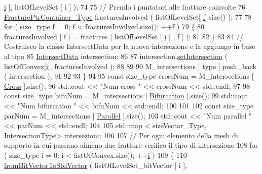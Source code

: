 \begin{DoxyCode}
      \hyperlink{matrici_8m_a6f6ccfcf58b31cb6412107d9d5281426}{i} ], listOfLevelSet [ i ] );
74             
75             \textcolor{comment}{// Prendo i puntatori alle fratture coinvolte}
76             \hyperlink{FractureHandler_8h_a2f0b57e18ecf89912d7de0c87158009e}{FracturePtrContainer\_Type} fracturesInvolved ( listOfLevelSet[
      \hyperlink{matrici_8m_a6f6ccfcf58b31cb6412107d9d5281426}{i}].size() );
77 
78             \textcolor{keywordflow}{for} ( size\_type f = 0; f < fracturesInvolved.size(); ++f )
79             \{
80                  fracturesInvolved [ f ] = fractures [ listOfLevelSet [ \hyperlink{matrici_8m_a6f6ccfcf58b31cb6412107d9d5281426}{i} ] [ f ] ];
81 
82             \}
83 
84             \textcolor{comment}{// Costruisco la classe IntersectData per la nuova intersezione e la aggiungo in base al tipo}
85             \hyperlink{classIntersectData}{IntersectData} intersection;
86 
87             intersection.\hyperlink{classIntersectData_a306be572e6e9a2359310ba908e693b2e}{setIntersection} ( listOfConvex[\hyperlink{matrici_8m_a6f6ccfcf58b31cb6412107d9d5281426}{i}], fracturesInvolved );
88             
89             
90             M\_intersections [ type ].push\_back ( intersection );
91 
92 
93         \}
94 
95         \textcolor{keyword}{const} size\_type crossNum = M\_intersections [ \hyperlink{classFractureIntersect_a9a4e4a784fa4c8e359767ed543f89dc5a743fef1af81c0e61412fafb9438b380e}{Cross} ].size();
96         std::cout << \textcolor{stringliteral}{"Num cross "} << crossNum << std::endl;
97 
98         \textcolor{keyword}{const} size\_type bifuNum = M\_intersections [ \hyperlink{classFractureIntersect_a9a4e4a784fa4c8e359767ed543f89dc5a4d466b3d3de0af7e18732b6f765bb1af}{Bifurcation} ].size();
99         std::cout << \textcolor{stringliteral}{"Num bifurcation "} << bifuNum << std::endl;
100 
101 
102         \textcolor{keyword}{const} size\_type parNum = M\_intersections [ \hyperlink{classFractureIntersect_a9a4e4a784fa4c8e359767ed543f89dc5ad91760e1506b52a828bc401490f7c92b}{Parallel} ].size();
103         std::cout << \textcolor{stringliteral}{"Num parallel "} << parNum << std::endl;
104 
105         std::map < sizeVector\_Type, IntersectionType> intersezioni;
106 
107         \textcolor{comment}{// Per ogni elemento della mesh di supporto in cui passano almeno due fratture verifico il tipo di
       intersezione}
108         \textcolor{keywordflow}{for} ( size\_type i = 0; i < listOfConvex.size(); ++\hyperlink{matrici_8m_a6f6ccfcf58b31cb6412107d9d5281426}{i} )
109         \{
110            \hyperlink{UsefulFunctions_8h_a0ea0b08a12a1e6a94718cf3bcd60edeb}{fromBitVectorToStdVector} ( listOfLevelSet\_bitVector [ i ], 

\end{DoxyCode}
